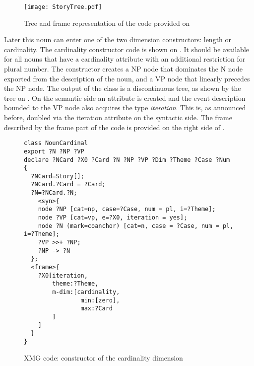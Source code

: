 \begin{figure}
\begin{minipage}{.5\textwidth}
\centering
\texttt{[image: StoryTree.pdf]}
\end{minipage}%
\begin{minipage}{0.5\textwidth}
\end{minipage}
\caption{Tree and frame representation of the code provided on \label{story:tree:frame}}
\end{figure}

Later this noun can enter one of the two dimension constructors: length or cardinality. The cardinality constructor code is shown on . It should be available for all nouns that have a cardinality attribute with an additional restriction for plural number. The constructor creates a NP node that dominates the N node exported from the description of the noun, and a VP node that linearly precedes the NP node. The output of the class is a discontinuous tree, as shown by the tree on . On the semantic side an \MDIM attribute is created and the event description bounded to the VP node also acquires the type \textit{iteration}. This is, as announced before, doubled via the iteration attribute on the syntactic side. The frame described by the frame part of the code is provided on the right side of .

\begin{figure}
\begin{verbatim}
class NounCardinal
export ?N ?NP ?VP
declare ?NCard ?X0 ?Card ?N ?NP ?VP ?Dim ?Theme ?Case ?Num 
{
  ?NCard=Story[];
  ?NCard.?Card = ?Card;
  ?N=?NCard.?N;
    <syn>{
    node ?NP [cat=np, case=?Case, num = pl, i=?Theme];
    node ?VP [cat=vp, e=?X0, iteration = yes];
    node ?N (mark=coanchor) [cat=n, case = ?Case, num = pl, i=?Theme];
    ?VP >>+ ?NP;
    ?NP -> ?N
  };
  <frame>{
    ?X0[iteration,
        theme:?Theme,
        m-dim:[cardinality,
                min:[zero],
                max:?Card
        ]
    ]
  }
}
\end{verbatim}
\caption{XMG code: constructor of the cardinality dimension \label{xmg:cardinality}}
\end{figure}

